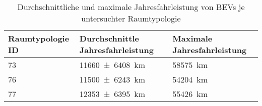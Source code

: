 {
\renewcommand{\arraystretch}{1.2}%
\begin{table}[H]
	\begin{center}
		\caption{Durchschnittliche und maximale Jahresfahrleistung von BEVs je untersuchter Raumtypologie}
		\begin{tabu} to \textwidth {X[1] X[1.5, r] X[1.5, r]}
			\hline
			Raumtypologie ID 	   & Durchschnittle Jahresfahrleistung                  & Maximale Jahresfahrleistung \\ \hline
			\num{73}               & \SI[separate-uncertainty = true]{11660(6408)}{\km} & \SI{58575}{\km}             \\
			\num{76}               & \SI[separate-uncertainty = true]{11500(6243)}{\km} & \SI{54204}{\km}             \\
			\num{77}               & \SI[separate-uncertainty = true]{12353(6395)}{\km} & \SI{55426}{\km}             \\ \hline
		\end{tabu}
		\label{tab:bev_distance}
	\end{center}
	\vspace{-3mm}%
\end{table}
}